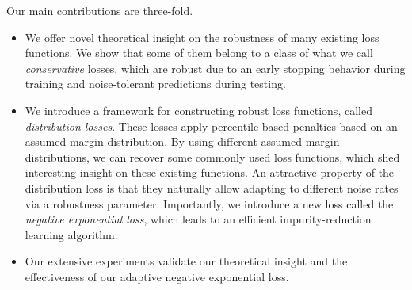 \documentclass[letterpaper]{article} %
\begin{document}
Our main contributions are three-fold.
\begin{itemize}
	\item We offer novel theoretical insight on the robustness of many existing
		loss functions.
		We show that some of them belong to a class of what we call
		\emph{conservative} losses, which are robust due to an early stopping
		behavior during training and noise-tolerant predictions during testing.
	\item We introduce a framework for constructing robust loss functions, called
		\emph{distribution losses}.
		These losses apply percentile-based penalties based on an assumed margin
		distribution.
		By using different assumed margin distributions, we can recover some commonly
		used loss functions, which shed interesting insight on these existing
		functions.
		An attractive property of the distribution loss is that they naturally allow
		adapting to different noise rates via a robustness parameter.
		Importantly, we introduce a new loss called the \emph{negative exponential loss},
		which leads to an efficient impurity-reduction learning algorithm.
	\item Our extensive experiments validate our theoretical insight and the
		effectiveness of our adaptive negative exponential loss.
\end{itemize}


\end{document}

